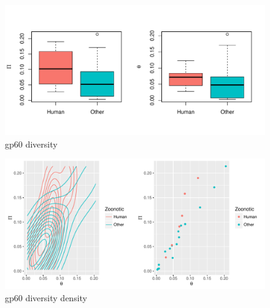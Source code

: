 \documentclass{article}
\begin{document}
\begin{figure}
\includegraphics{Fig-test7}
\caption{gp60 diversity}
\label{fig:y}
\end{figure}

\begin{figure}
\includegraphics{Fig-test8}
\caption{gp60 diversity density}
\label{fig:z}
\end{figure}
\end{document}

